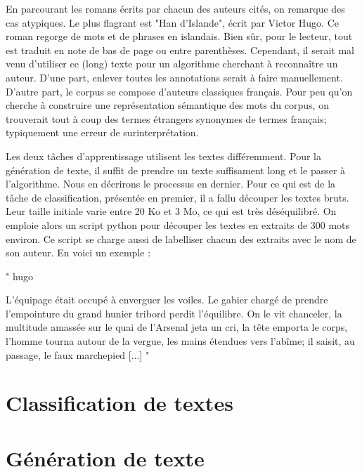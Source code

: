 En parcourant les romans écrits par chacun des auteurs cités, on remarque des cas atypiques. Le plus flagrant est "Han d'Islande", écrit par Victor Hugo. Ce roman regorge de mots et de phrases en islandais. Bien sûr, pour le lecteur, tout est traduit en note de bas de page ou entre parenthèses. Cependant, il serait mal venu d'utiliser ce (long) texte pour un algorithme cherchant à reconnaître un auteur. D'une part, enlever toutes les annotations serait à faire manuellement. D'autre part, le corpus se compose d'auteurs classiques français. Pour peu qu'on cherche à construire une représentation sémantique des mots du corpus, on trouverait tout à coup des termes étrangers synonymes de termes français; typiquement une erreur de surinterprétation.

Les deux tâches d'apprentissage utilisent les textes différemment. Pour la génération de texte, il suffit de prendre un texte suffisament long et le passer à l'algorithme. Nous en décrirons le processus en dernier. Pour ce qui est de la tâche de classification, présentée en premier, il a fallu découper les textes bruts. Leur taille initiale varie entre 20 Ko et 3 Mo, ce qui est très déséquilibré. On emploie alors un script python pour découper les textes en extraits de 300 mots environ. Ce script se charge aussi de labelliser chacun des extraits avec le nom de son auteur. En voici un exemple :

"
hugo


L'équipage était occupé à enverguer les voiles. Le gabier chargé de
prendre l'empointure du grand hunier tribord perdit l'équilibre. On le
vit chanceler, la multitude amassée sur le quai de l'Arsenal jeta un
cri, la tête emporta le corps, l'homme tourna autour de la vergue, les
mains étendues vers l'abîme; il saisit, au passage, le faux marchepied [...]
"


\section{Classification de textes}

\section{Génération de texte}

